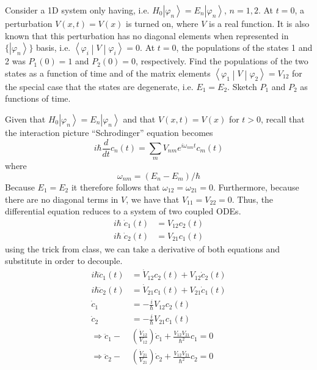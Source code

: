 \documentclass[a4paper, 11pt]{article}
\newcommand{\ket}[1]{\ensuremath{\left|#1\right\rangle}}
\newcommand{\matrixel}[3]{\ensuremath{\left\langle #1 \middle| #2 \middle| #3 \right\rangle}}
\newenvironment{solution}{%
	\begin{list}{}{%
			\setlength{\topsep}{0pt}%
			\setlength{\leftmargin}{0.5cm}%
			\setlength{\rightmargin}{0.5cm}%
			\setlength{\listparindent}{\parindent}%
			\setlength{\itemindent}{\parindent}%
			\setlength{\parsep}{\parskip}%
		}%
		\item[]}{\end{list}}
\begin{document}
\begin{enumerate}[leftmargin=0em, label=\textbf{\arabic*}]
  
  \item Consider a 1D system only having, i.e.
    $H_0\ket{\varphi_n}=E_n\ket{\varphi_n}$, $n=1,2$. At $t=0$, a perturbation
    $V(x,t)=V(x)$ is turned on, where $V$ is a real function. It is also known
    that this perturbation has no diagonal elements when represented in
    $\{\ket{\varphi_n}\}$ basis, i.e. $\matrixel{\varphi_i}{V}{\varphi_i}=0$. At
    $t=0$, the populations of the states 1 and 2 was $P_1(0)=1$ and $P_2(0)=0$,
    respectively. Find the populations of the two states as a function of time
    and of the matrix elements $\matrixel{\varphi_1}{V}{\varphi_2} = V_{12}$ for
    the special case that the states are degenerate, i.e. $E_1 = E_2$. Sketch
    $P_1$ and $P_2$ as functions of time.  \\

    \begin{solution}
      Given that $H_0\ket{\varphi_n}=E_n\ket{\varphi_n}$ and that
      $V(x,t)=V(x)$ for $t>0$, recall that the interaction picture
      ``Schrodinger'' equation becomes
      \begin{equation}
        i\hbar\frac{d}{d t}c_n(t) = \sum_m V_{nm}e^{i\omega_{nm}t}c_m(t)
      \end{equation}
      where
      \begin{equation}
        \omega_{nm}= (E_n-E_m)/\hbar
      \end{equation}
      Because $E_1=E_2$ it therefore follows that $\omega_{12}=\omega_{21}=0$.
      Furthermore, because there are no diagonal terms in $V$, we have that
      $V_{11}=V_{22}=0$. Thus, the differential equation reduces to a system of
      two coupled ODEs.
      \begin{align}
        i\hbar\;\dot c_1(t) &= V_{12}c_2(t) \\
        i\hbar\;\dot c_2(t) &= V_{21}c_1(t)
      \end{align}
      using the trick from class, we can take a derivative of both equations and
      substitute in order to decouple.
      \begin{align}
        i\hbar \ddot c_1(t) &= \dot V_{12}c_2(t)+V_{12}\dot c_2(t) \\
        i\hbar \ddot c_2(t) &= \dot V_{21}c_1(t)+V_{21}\dot c_1(t) \\
        \dot c_1 &= -\frac{i}{\hbar}V_{12}c_2(t) \\
        \dot c_2 &= -\frac{i}{\hbar}V_{21}c_1(t) \\
        \Rightarrow \ddot c_1 - &\left( \frac{\dot V_{12}}{V_{12}} \right)\dot c_1 + \frac{V_{12}V_{21}}{\hbar^2}c_1 = 0 \\
        \Rightarrow \ddot c_2 - &\left( \frac{\dot V_{21}}{V_{21}} \right)\dot c_2 + \frac{V_{12}V_{21}}{\hbar^2}c_2 = 0 
      \end{align}
      

\end{solution}
\end{enumerate}
\end{document}
